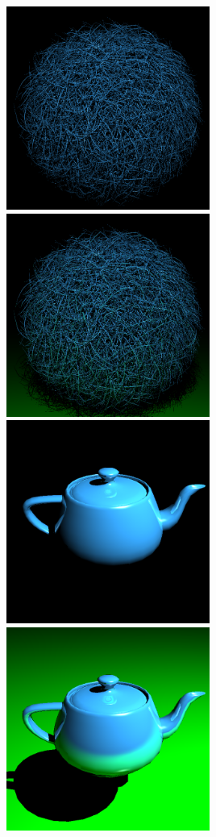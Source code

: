 \includegraphics[width=0.5\textwidth]{img/hairball.png}
\includegraphics[width=0.5\textwidth]{img/hairball-plane.png}
\includegraphics[width=0.5\textwidth]{img/teapot.png}
\includegraphics[width=0.5\textwidth]{img/teapot-plane.png}

